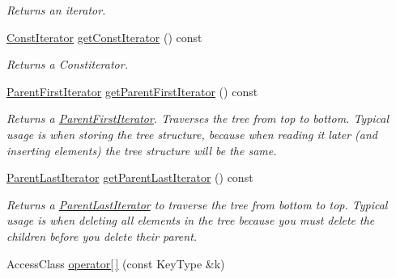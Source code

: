 \begin{DoxyCompactItemize}
\begin{DoxyCompactList}\small\item\em Returns an iterator. \end{DoxyCompactList}\item 
\mbox{\label{classirr_1_1core_1_1map_ad187f7170dd13dfa6d182b478c92942a}} 
\hyperlink{classirr_1_1core_1_1map_1_1ConstIterator}{Const\+Iterator} \hyperlink{classirr_1_1core_1_1map_ad187f7170dd13dfa6d182b478c92942a}{get\+Const\+Iterator} () const
\begin{DoxyCompactList}\small\item\em Returns a Constiterator. \end{DoxyCompactList}\item 
\mbox{\label{classirr_1_1core_1_1map_a3c55db71cb9dca4272fd8f99e5a045de}} 
\hyperlink{classirr_1_1core_1_1map_1_1ParentFirstIterator}{Parent\+First\+Iterator} \hyperlink{classirr_1_1core_1_1map_a3c55db71cb9dca4272fd8f99e5a045de}{get\+Parent\+First\+Iterator} () const
\begin{DoxyCompactList}\small\item\em Returns a \hyperlink{classirr_1_1core_1_1map_1_1ParentFirstIterator}{Parent\+First\+Iterator}. Traverses the tree from top to bottom. Typical usage is when storing the tree structure, because when reading it later (and inserting elements) the tree structure will be the same. \end{DoxyCompactList}\item 
\mbox{\label{classirr_1_1core_1_1map_a36bb25e9cf8b1d13cd0b5cc2301e1130}} 
\hyperlink{classirr_1_1core_1_1map_1_1ParentLastIterator}{Parent\+Last\+Iterator} \hyperlink{classirr_1_1core_1_1map_a36bb25e9cf8b1d13cd0b5cc2301e1130}{get\+Parent\+Last\+Iterator} () const
\begin{DoxyCompactList}\small\item\em Returns a \hyperlink{classirr_1_1core_1_1map_1_1ParentLastIterator}{Parent\+Last\+Iterator} to traverse the tree from bottom to top. Typical usage is when deleting all elements in the tree because you must delete the children before you delete their parent. \end{DoxyCompactList}\item 
Access\+Class \hyperlink{classirr_1_1core_1_1map_a396b601a40d70eb34aa6571e29f55992}{operator\mbox{[}$\,$\mbox{]}} (const Key\+Type \&k)

\end{DoxyCompactItemize}
